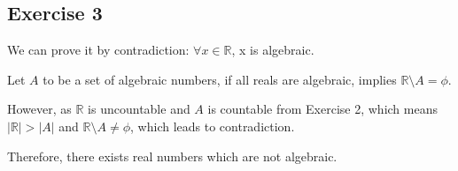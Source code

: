 \subsection*{Exercise 3}
We can prove it by contradiction: $\forall{x \in \mathbb{R}}$, x is algebraic.

Let $A$ to be a set of algebraic numbers, if all reals are algebraic, implies $\mathbb{R} \setminus A = \phi$.

However, as $\mathbb{R}$ is uncountable and $A$ is countable from Exercise 2, which means $|\mathbb{R}| > |A|$ and $\mathbb{R} \setminus A \neq \phi$, which leads to contradiction.

Therefore, there exists real numbers which are not algebraic.
